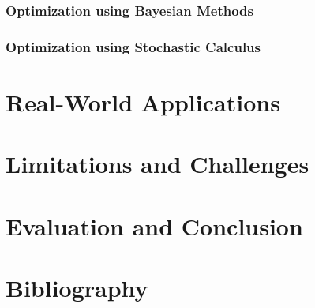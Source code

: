 \documentclass[12pt]{article}
\begin{document}
\subsubsection{Optimization using Bayesian Methods}
\subsubsection{Optimization using Stochastic Calculus}
\newpage
\section{Real-World Applications}
\newpage
\section{Limitations and Challenges}
\newpage
\section{Evaluation and Conclusion}
\newpage
\section{Bibliography}
\end{document}
